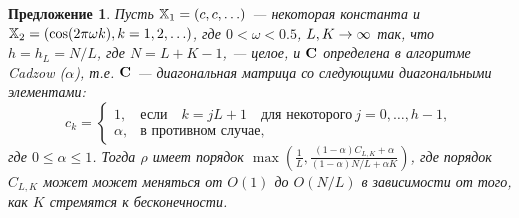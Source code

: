 \documentclass[12pt,a4paper,fleqn,leqno]{article}
\newtheorem{proposition}{Предложение}
\begin{document}
\begin{proposition}
\label{prop:separ1}
Пусть $\mathbb{X}_1 = (c, c, \ldots)$ --- некоторая константа и $\mathbb{X}_2 = (\cos(2 \pi \omega k), k = 1, 2, \ldots)$, где $0<\omega <0.5$, $L,K\rightarrow \infty$ так, что $h = h_L = N/L$, где $N=L+K-1$, --- целое, и $\mathbf{C}$ определена в алгоритме Cadzow ($\alpha$), т.е.  $\mathbf{C}$ --- диагональная матрица со следующими диагональными элементами:
\begin{equation*}
c_k = \begin{cases}
1, & \text{если} \quad k = jL+1 \quad \text{для некоторого} \ j = 0, \ldots, h-1,\\
\alpha, & \text{в противном случае},
\end{cases}
\end{equation*}
где $0 \le \alpha \le 1$. Тогда $\rho$ имеет порядок $\max(\frac{1}{L}, \frac{(1-\alpha)C_{L,K}+\alpha}{(1-\alpha)N/L+\alpha K})$, где порядок $C_{L,K}$
может может меняться от $O(1)$ до $O(N/L)$ в зависимости от того, как $K$ стремятся к бесконечности.
\end{proposition}
\end{document}
